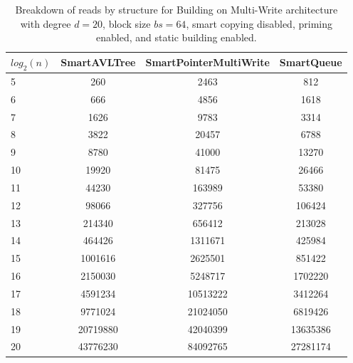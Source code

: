 \begin{table}[]
\centering
\begin{tabular}{|l|c|c|c|}
$log_2(n)$ & SmartAVLTree & SmartPointerMultiWrite & SmartQueue \\ \hline
5 & 260 & 2463 & 812 \\ \hline
6 & 666 & 4856 & 1618 \\ \hline
7 & 1626 & 9783 & 3314 \\ \hline
8 & 3822 & 20457 & 6788 \\ \hline
9 & 8780 & 41000 & 13270 \\ \hline
10 & 19920 & 81475 & 26466 \\ \hline
11 & 44230 & 163989 & 53380 \\ \hline
12 & 98066 & 327756 & 106424 \\ \hline
13 & 214340 & 656412 & 213028 \\ \hline
14 & 464426 & 1311671 & 425984 \\ \hline
15 & 1001616 & 2625501 & 851422 \\ \hline
16 & 2150030 & 5248717 & 1702220 \\ \hline
17 & 4591234 & 10513222 & 3412264 \\ \hline
18 & 9771024 & 21024050 & 6819426 \\ \hline
19 & 20719880 & 42040399 & 13635386 \\ \hline
20 & 43776230 & 84092765 & 27281174 \\ \hline
\end{tabular}
\caption{Breakdown of reads by structure for Building on Multi-Write architecture with degree $d=20$, block size $bs=64$, smart copying disabled, priming enabled, and static building enabled.}
    \label{tab:reads_by_structure_build_d20_bs64_copiesfalse_primetrue_staticinsertiontrue_ptmultiwrite_movetrue}
\end{table}

